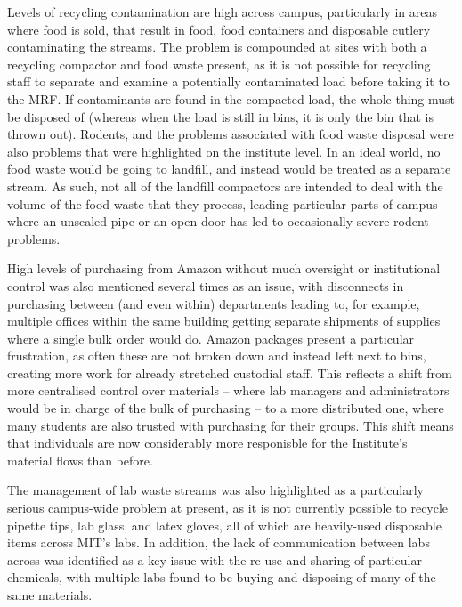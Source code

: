 \documentclass[nofonts,nols,justified,nobib]{tufte-book}
\begin{document}
Levels of recycling contamination are high across campus, particularly in areas where food is sold, that result in food, food containers and disposable cutlery contaminating the streams. The problem is compounded at sites with both a recycling compactor and food waste present, as it is not possible for recycling staff to separate and examine a potentially contaminated load before taking it to the MRF. If contaminants are found in the compacted load, the whole thing must be disposed of (whereas when the load is still in bins, it is only the bin that is thrown out). Rodents, and the problems associated with food waste disposal were also problems that were highlighted on the institute level. In an ideal world, no food waste would be going to landfill, and instead would be treated as a separate stream. As such, not all of the landfill compactors are intended to deal with the volume of the food waste that they process, leading particular parts of campus where an unsealed pipe or an open door has led to occasionally severe rodent problems.

High levels of purchasing from Amazon without much oversight or institutional control was also mentioned several times as an issue, with disconnects in purchasing between (and even within) departments leading to, for example, multiple offices within the same building getting separate shipments of supplies where a single bulk order would do. Amazon packages present a particular frustration, as often these are not broken down and instead left next to bins, creating more work for already stretched custodial staff. This reflects a shift from more centralised control over materials -- where lab managers and administrators would be in charge of the bulk of purchasing -- to a more distributed one, where many students are also trusted with purchasing for their groups. This shift means that individuals are now considerably more responisble for the Institute's material flows than before.


The management of lab waste streams was also highlighted as a particularly serious campus-wide problem at present, as it is not currently possible to recycle pipette tips, lab glass, and latex gloves, all of which are heavily-used disposable items across MIT's labs. In addition, the lack of communication between labs across was identified as a key issue with the re-use and sharing of particular chemicals, with multiple labs found to be buying and disposing of many of the same materials. 
\end{document}
